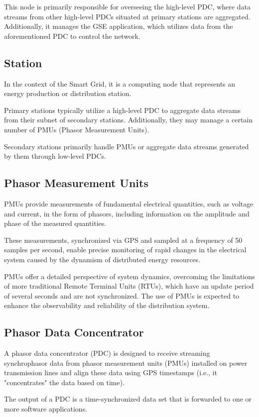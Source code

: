 This node is primarily responsible for overseeing the high-level PDC, where data streams from other high-level PDCs situated at primary stations are aggregated. Additionally, it manages the GSE application, which utilizes data from the aforementioned PDC to control the network.

\subsection{Station}
In the context of the Smart Grid, it is a computing node that represents an energy production or distribution station.

Primary stations typically utilize a high-level PDC to aggregate data streams from their subnet of secondary stations. Additionally, they may manage a certain number of PMUs (Phasor Measurement Units).

Secondary stations primarily handle PMUs or aggregate data streams generated by them through low-level PDCs.

\subsection{Phasor Measurement Units}
PMUs provide measurements of fundamental electrical quantities, such as voltage and current, in the form of phasors, including information on the amplitude and phase of the measured quantities. 

These measurements, synchronized via GPS and sampled at a frequency of 50 samples per second, enable precise monitoring of rapid changes in the electrical system caused by the dynamism of distributed energy resources.

PMUs offer a detailed perspective of system dynamics, overcoming the limitations of more traditional Remote Terminal Units (RTUs), which have an update period of several seconds and are not synchronized. The use of PMUs is expected to enhance the observability and reliability of the distribution system.

\subsection{Phasor Data Concentrator}
A phasor data concentrator (PDC) is designed to receive streaming synchrophasor data from phasor measurement units (PMUs) installed on power transmission lines and align these data using GPS timestamps (i.e., it "concentrates" the data based on time). 

The output of a PDC is a time-synchronized data set that is forwarded to one or more software applications.

